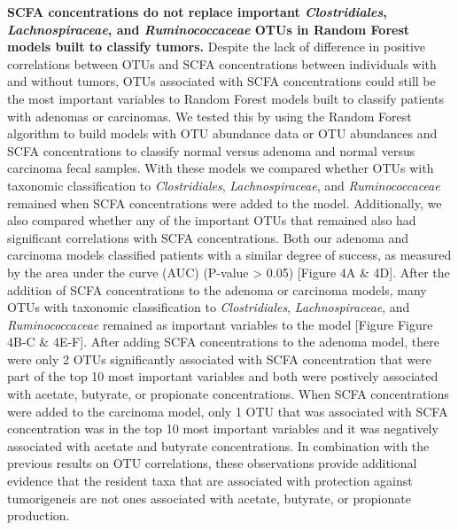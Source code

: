 \documentclass[11pt,]{article}
\begin{document}
\textbf{SCFA concentrations do not replace important
\emph{Clostridiales}, \emph{Lachnospiraceae}, and \emph{Ruminococcaceae}
OTUs in Random Forest models built to classify tumors.} Despite the lack
of difference in positive correlations between OTUs and SCFA
concentrations between individuals with and without tumors, OTUs
associated with SCFA concentrations could still be the most important
variables to Random Forest models built to classify patients with
adenomas or carcinomas. We tested this by using the Random Forest
algorithm to build models with OTU abundance data or OTU abundances and
SCFA concentrations to classify normal versus adenoma and normal versus
carcinoma fecal samples. With these models we compared whether OTUs with
taxonomic classification to \emph{Clostridiales},
\emph{Lachnospiraceae}, and \emph{Ruminococcaceae} remained when SCFA
concentrations were added to the model. Additionally, we also compared
whether any of the important OTUs that remained also had significant
correlations with SCFA concentrations. Both our adenoma and carcinoma
models classified patients with a similar degree of success, as measured
by the area under the curve (AUC) (P-value \textgreater{} 0.05)
{[}Figure 4A \& 4D{]}. After the addition of SCFA concentrations to the
adenoma or carcinoma models, many OTUs with taxonomic classification to
\emph{Clostridiales}, \emph{Lachnospiraceae}, and \emph{Ruminococcaceae}
remained as important variables to the model {[}Figure Figure 4B-C \&
4E-F{]}. After adding SCFA concentrations to the adenoma model, there
were only 2 OTUs significantly associated with SCFA concentration that
were part of the top 10 most important variables and both were postively
associated with acetate, butyrate, or propionate concentrations. When
SCFA concentrations were added to the carcinoma model, only 1 OTU that
was associated with SCFA concentration was in the top 10 most important
variables and it was negatively associated with acetate and butyrate
concentrations. In combination with the previous results on OTU
correlations, these observations provide additional evidence that the
resident taxa that are associated with protection against tumorigeneis
are not ones associated with acetate, butyrate, or propionate
production.
\end{document}

